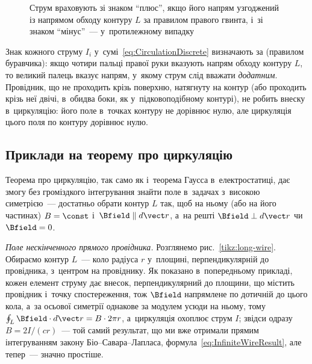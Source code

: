 \begin{figure}\centering
	\caption{Струм враховують зі знаком \enquote{плюс}, якщо його напрям узгоджений із
		напрямом обходу контуру $L$ за правилом правого гвинта, і~зі знаком
		\enquote{мінус}~--- у~протилежному випадку\label{pic:CirculationSigns}}
\end{figure}

\begin{Attention}
	Знак кожного струму $I_i$ у~сумі~\eqref{eq:CirculationDiscrete} визначають за
	 (правилом буравчика): якщо чотири пальці правої руки
	вказують напрям обходу контуру $L$, то великий палець вказує напрям, у~якому струм
	слід вважати \emph{додатним}. Провідник, що не проходить крізь поверхню, натягнуту на
	контур (або проходить крізь неї двічі, в~обидва боки, як у~підковоподібному контурі),
	не робить внеску в~циркуляцію: його поле в~точках контуру не дорівнює нулю, але
	циркуляція цього поля по контуру дорівнює нулю.
\end{Attention}


\subsection*{Приклади на теорему про циркуляцію}


Теорема про циркуляцію, так само як і~теорема Гаусса в~електростатиці, дає змогу без
громіздкого інтегрування знайти поле в~задачах з~високою симетрією~--- достатньо обрати
контур $L$ так, щоб на ньому (або на його частинах) $B = \const$ і~$\Bfield \parallel d\vect r$,
а~на решті $\Bfield \perp d\vect r$ чи $\Bfield = 0$.

\emph{Поле нескінченного прямого провідника.} Розглянемо рис.~\ref{tikz:long-wire}.
Обираємо контур $L$~--- коло радіуса $r$ у~площині, перпендикулярній до провідника,
з~центром на провіднику. Як показано в~попередньому прикладі, кожен елемент струму дає
внесок, перпендикулярний до площини, що містить провідник і~точку спостереження, тож $\Bfield$
напрямлене по дотичній до цього кола, а~за осьової симетрії однакове за модулем усюди на
ньому, тому $\oint_L \Bfield\cdot d\vect r = B\cdot
	2\pi r$, а~циркуляція охоплює струм $I$; звідси одразу $B = 2I/(cr)$~--- той самий
результат, що ми вже отримали прямим інтегруванням закону Біо--Савара--Лапласа,
формула~\eqref{eq:InfiniteWireResult}, але тепер~--- значно простіше.

